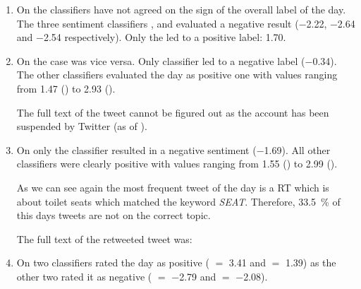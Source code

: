 \begin{enumerate}
    \item
        On  the classifiers have not agreed on the sign of the overall label of the day.
        The three sentiment classifiers \fnb{}, \fme{} and \fsvm{} evaluated a negative result (\num{-2.22}, \num{-2.64} and \num{-2.54} respectively).
        Only the \ftb{} led to a positive label: \num{1.70}.


    \item
        On  the case was vice versa.
        Only classifier \fnb{} led to a negative label (\num{-0.34}).
        The other classifiers evaluated the day as positive one with values ranging from \num{1.47} (\ftb{}) to \num{2.93} (\fsvm{}).


        The full text of the tweet cannot be figured out as the account has been suspended by Twitter (as of ).

    \item
        On  only the \tb{} classifier resulted in a negative sentiment (\num{-1.69}).
        All other classifiers were clearly positive with values ranging from \num{1.55} (\fme{}) to \num{2.99} (\fnb{}).


        As we can see again the most frequent tweet of the day is a \ac{RT} which is about toilet seats which matched the keyword \emph{SEAT}.
        Therefore, \SI{33.5}{\percent} of this days tweets are not on the correct topic.

        The full text of the retweeted tweet was:

    \item
        On  two classifiers rated the day as positive (\ftb{} $=$ \num{3.41} and \fme{} $=$ \num{1.39}) as the other two rated it as negative (\fnb{} $=$ \num{-2.79} and \fsvm{} $=$ \num{-2.08}).    


\end{enumerate}
